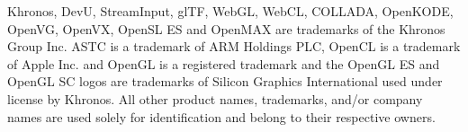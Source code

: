 \documentclass[oneside]{book}
\begin{document}
\begin{copyrightpage}
Khronos, DevU, StreamInput, glTF, WebGL, WebCL, COLLADA, OpenKODE, OpenVG, OpenVX, OpenSL ES and OpenMAX are trademarks of the Khronos Group Inc.  ASTC is a trademark of ARM Holdings PLC, OpenCL is a trademark of Apple Inc. and OpenGL is a registered trademark and the OpenGL ES and OpenGL SC logos are trademarks of Silicon Graphics International used under license by Khronos.  All other product names, trademarks, and/or company names are used solely for identification and belong to their respective owners.

\end{copyrightpage}
\tableofcontents
{}
\hypersetup{pageanchor=true,citecolor=blue}
\end{document}
